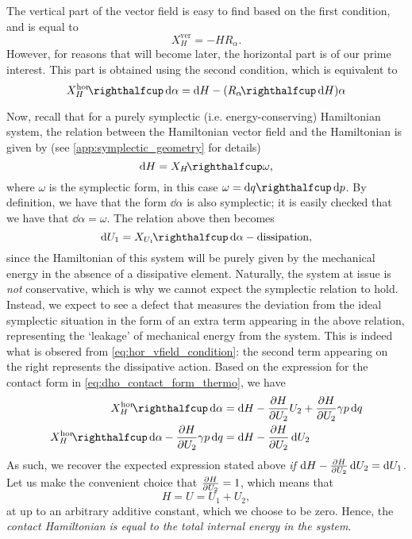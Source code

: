 The vertical part of the vector field is easy to find based on the first condition, and is equal to
$$ X_H^\text{ver} = -H R_\alpha. $$
However, for reasons that will become later, the horizontal part is of our prime interest. This part is obtained using the second condition, which is equivalent to
\begin{equation}
    \intpr{X_H^\text{hor}}{\dd{\alpha}} = \dd{H} - (\intpr{R_\alpha}{\dd{H}}) \alpha 
    \label{eq:hor_vfield_condition}
\end{equation}

Now, recall that for a purely symplectic (i.e. energy-conserving) Hamiltonian system, the relation between the Hamiltonian vector field and the Hamiltonian is given by (see \cref{app:symplectic_geometry} for details) 
$$ \dd{H} = \intpr{X_H}{\omega}, $$
where $\omega$ is the symplectic form, in this case $\omega = \intpr{\dd{q}}{\dd{p}}$. By definition, we have that the form $\dd{\alpha}$ is also symplectic; it is easily checked that we have that $\dd{\alpha} = \omega$. The relation above then becomes 
$$ \dd{U_1} = \intpr{X_{U_1}}{\dd{\alpha}} - \text{dissipation}, $$
since the Hamiltonian of this system will be purely given by the mechanical energy in the absence of a dissipative element. Naturally, the system at issue is \emph{not} conservative, which is why we cannot expect the symplectic relation to hold. Instead, we expect to see a defect that measures the deviation from the ideal symplectic situation in the form of an extra term appearing in the above relation, representing the `leakage' of mechanical energy from the system. This is indeed what is obsered from \cref{eq:hor_vfield_condition}: the second term appearing on the right represents the dissipative action. Based on the expression for the contact form in \cref{eq:dho_contact_form_thermo}, we have
\begin{equation} 
    \begin{split}
        \intpr{X_H^\text{hor}}{\dd{\alpha}} &= \dd{H}  - \pdv{H}{U_2}U_2 + \pdv{H}{U_2}\gamma p\dd{q} \\
        \intpr{X_H^\text{hor}}{\dd{\alpha}} - \pdv{H}{U_2}\gamma p\dd{q} &= \dd{H}  - \pdv{H}{U_2}\dd{U_2}
    \end{split}
\end{equation}
As such, we recover the expected expression stated above \emph{if} $\dd{H} - \pdv{H}{U_2}\dd{U_2} = \dd{U_1}$. Let us make the convenient choice that $\pdv{H}{U_2} = 1$, which means that 
$$ H = U = U_1 + U_2, $$
at up to an arbitrary additive constant, which we choose to be zero. Hence, the \emph{contact Hamiltonian is equal to the total internal energy in the system}.

